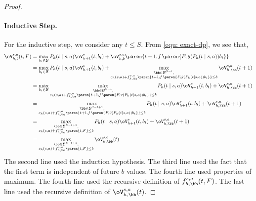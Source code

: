 \documentclass[pdftex, a4paper, 12pt]{article}
\newcommand{\mB}{\mathcal{B}}
\DeclareMathOperator*{\f}{\mathit{f}}
\DeclareMathOperator*{\g}{\mathit{g}}
\begin{document}
\begin{proof}
    \paragraph{Inductive Step.}  For the inductive step, we consider any $t \leq S$. From \eqref{equ: exact-dp}, we see that,
    \begin{align*}
        \oV_{h,b}^{s,a}(t,F) &= \max_{b_t \in \mB} P_h(t \mid s,a)\oV^*_{h+1}(t,b_t) + \oV_{h,b}^{s,a}\paren{t+1, \f\paren{F, \g(P_h(t \mid s,a)) b_t}}\\
        &= \max_{b_t \in \mB} P_h(t \mid s,a)\oV^*_{h+1}(t,b_t) + \max_{\substack{\bb \in \mB^{S-t}, \\ c_h(s,a) + f_{h,\bb}^{s,a}\paren{t+1, \f\paren{F, \g(P_h(t \mid s,a)) b_t}} \leq b}}\oV_{h, \bb}^{s,a}(t+1)\\
        &= \max_{b_t \in \mB}\max_{\substack{\bb \in \mB^{S-t}, \\ c_h(s,a) + f_{h,\bb}^{s,a}\paren{t+1, \f\paren{F, \g(P_h(t \mid s,a)) b_t}} \leq b}} P_h(t \mid s,a)\oV^*_{h+1}(t,b_t) + \oV_{h, \bb}^{s,a}(t+1) \\
        &=\max_{\substack{\bb \in \mB^{S-t+1}, \\ c_h(s,a) + f_{h,\bb}^{s,a}\paren{t+1, \f\paren{F, \g(P_h(t \mid s,a)) b_t}} \leq b}} P_h(t \mid s,a)\oV^*_{h+1}(t,b_t) + \oV_{h, \bb}^{s,a}(t+1) \\
        &=\max_{\substack{\bb \in \mB^{S-t+1}, \\ c_h(s,a) + f_{h,\bb}^{s,a}\paren{t, F} \leq b}} P_h(t \mid s,a)\oV^*_{h+1}(t,b_t) + \oV_{h, \bb}^{s,a}(t+1) \\
        &= \max_{\substack{\bb \in \mB^{S-t+1}, \\ c_h(s,a) + f_{h,\bb}^{s,a}\paren{t, F} \leq b}} \oV_{h, \bb}^{s,a}(t)
    \end{align*}
    The second line used the induction hypothesis. The third line used the fact that the first term is independent of future $b$ values. The fourth line used properties of maximum. The fourth line used the recursive definition of $f_{h,\bb}^{s,a}(t, F)$. The last line used the recursive definition of $\oV_{h,\bb}^{s,a}(t)$. 


\end{proof}
\end{document}
